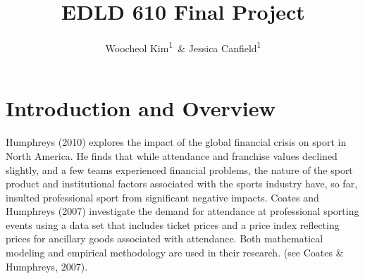 \documentclass[man, fleqn, noextraspace,floatsintext]{apa6}
\title{EDLD 610 Final Project}
\author{Woocheol Kim\textsuperscript{1}~\& Jessica Canfield\textsuperscript{1}}
\date{}
\affiliation{
\vspace{0.5cm}
\textsuperscript{1} University of Oregon}
\newenvironment{Shaded}{\begin{snugshade}}{\end{snugshade}}
\newcommand{\CommentTok}[1]{\textcolor[rgb]{0.56,0.35,0.01}{\textit{#1}}}
\newcommand{\DataTypeTok}[1]{\textcolor[rgb]{0.13,0.29,0.53}{#1}}
\newcommand{\KeywordTok}[1]{\textcolor[rgb]{0.13,0.29,0.53}{\textbf{#1}}}
\newcommand{\NormalTok}[1]{#1}
\newcommand{\OperatorTok}[1]{\textcolor[rgb]{0.81,0.36,0.00}{\textbf{#1}}}
\newcommand{\StringTok}[1]{\textcolor[rgb]{0.31,0.60,0.02}{#1}}
\begin{document}
\maketitle

\hypertarget{introduction-and-overview}{%
\section{Introduction and Overview}\label{introduction-and-overview}}

Humphreys (2010) explores the impact of the global financial crisis on sport in North America. He finds that while attendance and franchise values declined slightly, and a few teams experienced financial problems, the nature of the sport product and institutional factors associated with the sports industry have, so far, insulted professional sport from significant negative impacts. Coates and Humphreys (2007) investigate the demand for attendance at professional sporting events using a data set that includes ticket prices and a price index reflecting prices for ancillary goods associated with attendance. Both mathematical modeling and empirical methodology are used in their research. (see Coates \& Humphreys, 2007).

\begin{Shaded}
\end{Shaded}
\end{document}
